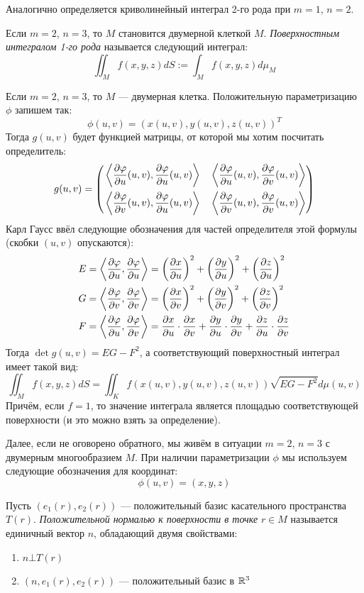 \begin{note}
	Аналогично определяется криволинейный интеграл 2-го рода при $m = 1$, $n = 2$.
\end{note}

\begin{definition}
	Если $m = 2$, $n = 3$, то $M$ становится двумерной клеткой $M$. \textit{Поверхностным интегралом 1-го рода} называется следующий интеграл:
	\[
		\iint_M f(x, y, z)dS := \int_M f(x, y, z)d\mu_M
	\]
\end{definition}

\begin{note}
	Если $m = 2$, $n = 3$, то $M$ --- двумерная клетка. Положительную параметризацию $\phi$ запишем так:
	\[
		\phi(u, v) = (x(u, v), y(u, v), z(u, v))^T
	\]
	Тогда $g(u, v)$ будет функцией матрицы, от которой мы хотим посчитать определитель:
	\[
		g(u, v) = \left( \begin{aligned} 
			&\left\langle\frac{\partial \varphi}{\partial u}(u, v), \frac{\partial \varphi}{\partial u}(u, v)\right\rangle& &\left\langle\frac{\partial \varphi}{\partial u}(u, v), \frac{\partial \varphi}{\partial v}(u, v)\right\rangle
			\\
			&\left\langle\frac{\partial \varphi}{\partial v}(u, v), \frac{\partial \varphi}{\partial u}(u, v)\right\rangle& &\left\langle\frac{\partial \varphi}{\partial v}(u, v), \frac{\partial \varphi}{\partial v}(u, v)\right\rangle
		 \end{aligned} \right)
	\]
	Карл Гаусс ввёл следующие обозначения для частей определителя этой формулы (скобки $(u, v)$ опускаются):
	\begin{align*}
		&{E = \left\langle\frac{\partial \varphi}{\partial u}, \frac{\partial \varphi}{\partial u}\right\rangle = \left(\frac{\partial x}{\partial u}\right)^2 + \left(\frac{\partial y}{\partial u}\right)^2 + \left(\frac{\partial z}{\partial u}\right)^2}
		\\
		&{G = \left\langle\frac{\partial \varphi}{\partial v}, \frac{\partial \varphi}{\partial v}\right\rangle = \left(\frac{\partial x}{\partial v}\right)^2 + \left(\frac{\partial y}{\partial v}\right)^2 + \left(\frac{\partial z}{\partial v}\right)^2}
		\\
		&{F = \left\langle\frac{\partial \varphi}{\partial u}, \frac{\partial \varphi}{\partial v}\right\rangle = \frac{\partial x}{\partial u} \cdot \frac{\partial x}{\partial v} + \frac{\partial y}{\partial u} \cdot \frac{\partial y}{\partial v} + \frac{\partial z}{\partial u} \cdot \frac{\partial z}{\partial v}}
	\end{align*}
	Тогда $\det g(u, v) = EG - F^2$, а соответствующий поверхностный интеграл имеет такой вид:
	\[
		\iint_M f(x, y, z)dS = \iint_K f(x(u, v), y(u, v), z(u, v))\sqrt{EG - F^2}d\mu(u, v)
	\]
	Причём, если $f = 1$, то значение интеграла является площадью соответствующей поверхности (и это можно взять за определение).
\end{note}

\begin{note}
	Далее, если не оговорено обратного, мы живём в ситуации $m = 2$, $n = 3$ с двумерным многообразием $M$. При наличии параметризации $\phi$ мы используем следующие обозначения для координат:
	\[
		\phi(u, v) = (x, y, z)
	\]
\end{note}

\begin{definition}
	Пусть $(e_1(r), e_2(r))$ --- положительный базис касательного пространства $T(r)$. \textit{Положительной нормалью к поверхности в точке} $r \in M$ называется единичный вектор $n$, обладающий двумя свойствами:
	\begin{enumerate}
		\item $n \bot T(r)$
		
		\item $(n, e_1(r), e_2(r))$ --- положительный базис в $\mathbb{R}^3$
	\end{enumerate}
\end{definition}

